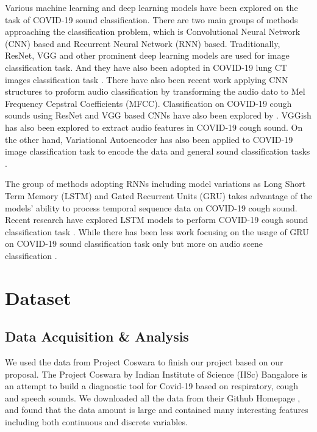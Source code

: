 \documentclass[11pt]{article}
\begin{document}
Various machine learning and deep learning models have been explored on the task of COVID-19 sound classification. There are two main groups of methods approaching the classification problem, which is Convolutional Neural Network (CNN) based and Recurrent Neural Network (RNN) based. Traditionally, ResNet, VGG and other prominent deep learning models are used for image classification task. And they have also been adopted in COVID-19 lung CT images classification task \cite{sitaula2021attention,rahimzadeh2020modified}. There have also been recent work applying CNN structures to proform audio classification by transforming the audio dato to Mel Frequency Cepstral Coefficients (MFCC). Classification on COVID-19 cough sounds using ResNet and VGG based CNNs have also been explored by \cite{schuller2020detecting,brown2020exploring}. VGGish has also been explored to extract audio features in COVID-19 cough sound. On the other hand, Variational Autoencoder has also been applied to COVID-19 image classification task to encode the data \cite{mansour2021unsupervised} and general sound classification tasks \cite{teh2021open}.

The group of methods adopting RNNs including model variations as Long Short Term Memory (LSTM) and Gated Recurrent Units (GRU) takes advantage of the models’ ability to process temporal sequence data on COVID-19 cough sound. Recent research have explored LSTM models to perform COVID-19 cough sound classification task \cite{hassan2020covid,pahar2021covid}. While there has been less work focusing on the usage of GRU on COVID-19 sound classification task only but more on audio scene classification \cite{phan2017audio}. 

\section{Dataset}

\subsection{Data Acquisition \& Analysis}

We used the data from Project Coswara to finish our project based on our proposal. The Project Coswara by Indian Institute of Science (IISc) Bangalore is an attempt to build a diagnostic tool for Covid-19 based on respiratory, cough and speech sounds. We downloaded all the data from their Github Homepage \cite{coswara}, and found that the data amount is large and contained many interesting features including both continuous and discrete variables.
\end{document}
